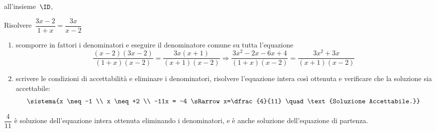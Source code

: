 % 
all'insieme~\(\ID\), 
% 
% 

 \begin{esempio}{}{}
Risolvere~\(\dfrac{3x-2}{1+x}=\dfrac{3x}{x-2}\)
 
\begin{enumerate}[nosep]
\item scomporre in fattori i denominatori e eseguire il  denominatore comune 
su tutta l'equazione
\[\frac{(x-2)(3x-2)}{(1+x)(x-2)}=\frac{3x(x+1)}{(x+1)(x-2)}\Rightarrow
\frac{3x^{2}-2x-6x+4}{(1+x)(x-2)}=\frac{3x^2+3x}{(x+1)(x-2)}\]
\item scrivere le condizioni di accettabilità e eliminare i denominatori,
risolvere l'equazione intera così ottenuta e verificare che la soluzione sia 
accettabile:
\[\sistema{x \neq -1 \\ 
           x \neq +2 \\ 
           -11x = -4 \sRarrow x=\dfrac{4}{11} \quad 
             \text{Soluzione Accettabile.}}\]
\end{enumerate}
\(\dfrac{4}{11}\) è soluzione dell'equazione intera ottenuta eliminando i 
denominatori, e è anche soluzione dell'equazione di partenza.
 \end{esempio}

